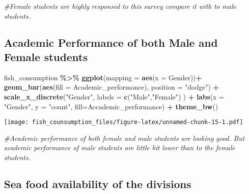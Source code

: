 \documentclass[
]{article}
\newenvironment{Shaded}{\begin{snugshade}}{\end{snugshade}}
\newcommand{\AttributeTok}[1]{\textcolor[rgb]{0.13,0.29,0.53}{#1}}
\newcommand{\CommentTok}[1]{\textcolor[rgb]{0.56,0.35,0.01}{\textit{#1}}}
\newcommand{\FunctionTok}[1]{\textcolor[rgb]{0.13,0.29,0.53}{\textbf{#1}}}
\newcommand{\NormalTok}[1]{#1}
\newcommand{\SpecialCharTok}[1]{\textcolor[rgb]{0.81,0.36,0.00}{\textbf{#1}}}
\newcommand{\StringTok}[1]{\textcolor[rgb]{0.31,0.60,0.02}{#1}}
\begin{document}
\begin{Shaded}
\begin{Highlighting}[]
\CommentTok{\#Female students are highly responsed to this survey compare it with to male students. }
\end{Highlighting}
\end{Shaded}

\hypertarget{academic-performance-of-both-male-and-female-students}{%
\subsection{Academic Performance of both Male and Female
students}\label{academic-performance-of-both-male-and-female-students}}

\begin{Shaded}
\begin{Highlighting}[]
\NormalTok{fish\_consumption }\SpecialCharTok{\%\textgreater{}\%}
\FunctionTok{ggplot}\NormalTok{(}\AttributeTok{mapping =} \FunctionTok{aes}\NormalTok{(}\AttributeTok{x =}\NormalTok{ Gender))}\SpecialCharTok{+}
\FunctionTok{geom\_bar}\NormalTok{(}\FunctionTok{aes}\NormalTok{(}\AttributeTok{fill =}\NormalTok{ Academic\_performance), }\AttributeTok{position =} \StringTok{"dodge"}\NormalTok{) }\SpecialCharTok{+}
\FunctionTok{scale\_x\_discrete}\NormalTok{(}\StringTok{"Gender"}\NormalTok{, }\AttributeTok{labels =} \FunctionTok{c}\NormalTok{(}\StringTok{"Male"}\NormalTok{,}\StringTok{"Female"}\NormalTok{) ) }\SpecialCharTok{+}
\FunctionTok{labs}\NormalTok{(}\AttributeTok{x =} \StringTok{"Gender"}\NormalTok{, }\AttributeTok{y =} \StringTok{"count"}\NormalTok{, }\AttributeTok{fill=}\StringTok{\textquotesingle{}Accademic\_performance\textquotesingle{}}\NormalTok{) }\SpecialCharTok{+}
\FunctionTok{theme\_bw}\NormalTok{()}
\end{Highlighting}
\end{Shaded}

\texttt{[image: fish\_counsumption\_files/figure-latex/unnamed-chunk-15-1.pdf]}

\begin{Shaded}
\begin{Highlighting}[]
\CommentTok{\#Academic performance of both female and male students are looking good. But academic performance of male students are little bit lower than to the female students. }
\end{Highlighting}
\end{Shaded}

\hypertarget{sea-food-availability-of-the-divisions}{%
\subsection{Sea food availability of the
divisions}\label{sea-food-availability-of-the-divisions}}
\end{document}

